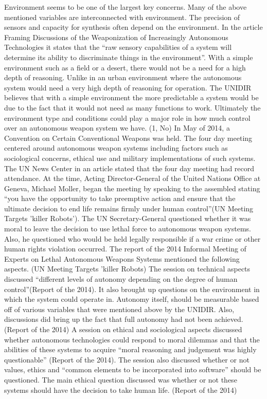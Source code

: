 \documentclass{report}
\begin{document}
Environment seems to be one of the largest key concerns. Many of the above mentioned variables are interconnected with environment. The precision of sensors and capacity for synthesis often depend on the environment. In the article Framing Discussions of the Weaponization of Increasingly Autonomous Technologies it states that the “raw sensory capabilities of a system will determine its ability to discriminate things in the environment”. With a simple environment such as a field or a desert, there would not be a need for a high depth of reasoning. Unlike in an urban environment where the autonomous system would need a very high depth of reasoning for operation. The UNIDIR believes that with a simple environment the more predictable a system would be due to the fact that it would not need as many functions to work. Ultimately the environment type and conditions could play a major role in how much control over an autonomous weapon system we have. (1, No)
In May of 2014, a Convention on Certain Conventional Weapons was held. The four day meeting centered around autonomous weapon systems including factors such as sociological concerns, ethical use and military implementations of such systems. The UN News Center in an article stated that the four day meeting had record attendance. At the time, Acting Director-General of the United Nations Office at Geneva, Michael Moller, began the meeting by speaking to the assembled stating “you have the opportunity to take preemptive action and ensure that the ultimate decision to end life remains firmly under human control”(UN Meeting Targets 'killer Robots'). The UN Secretary-General questioned whether it was moral to leave the decision to use lethal force to autonomous weapon systems. Also, he questioned who would be held legally responsible if a war crime or other human rights violation occurred. The report of the 2014 Informal Meeting of Experts on Lethal Autonomous Weapons Systems mentioned the following aspects. (UN Meeting Targets 'killer Robots)
The session on technical aspects discussed “different levels of autonomy depending on the degree of human control”(Report of the 2014). It also brought up questions on the environment in which the system could operate in. Autonomy itself, should be measurable based off of various variables that were mentioned above by the UNIDIR. Also, discussions did bring up the fact that full autonomy had not been achieved.(Report of the 2014)
A session on ethical and sociological aspects discussed whether autonomous technologies could respond to moral dilemmas and that the abilities of these systems to acquire “moral reasoning and judgement was highly questionable” (Report of the 2014). The session also discussed whether or not values, ethics and “common elements to be incorporated into software” should be questioned. The main ethical question discussed was whether or not these systems should have the decision to take human life. (Report of the 2014)
\end{document}

